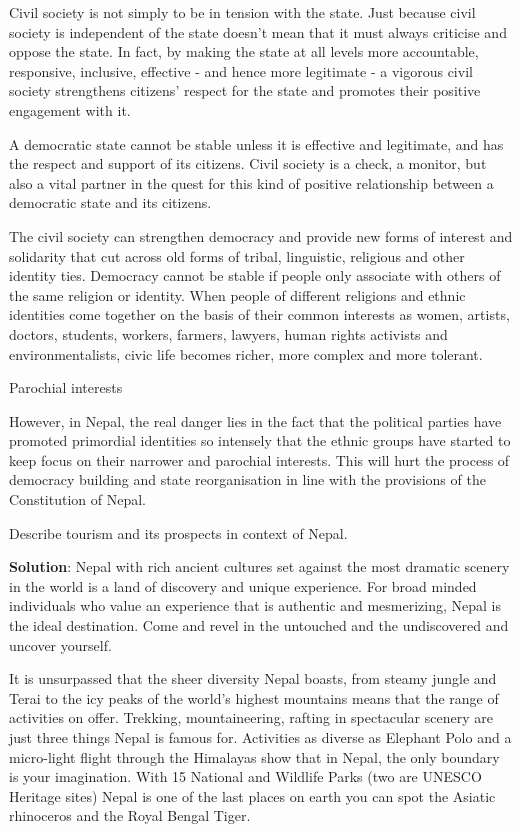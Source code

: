 \documentclass[
]{book}
\newcommand{\question}{\item}
\newenvironment{solution}{ {\bfseries Solution}:}{}
\begin{document}
\begin{questions}
Civil society is not simply to be in tension with the state. Just because civil society is independent of the state doesn't mean that it must always criticise and oppose the state. In fact, by making the state at all levels more accountable, responsive, inclusive, effective - and hence more legitimate - a vigorous civil society strengthens citizens' respect for the state and promotes their positive engagement with it.

A democratic state cannot be stable unless it is effective and legitimate, and has the respect and support of its citizens.  Civil society is a check, a monitor, but also a vital partner in the quest for this kind of positive relationship between a democratic state and its citizens.

The  civil society can strengthen democracy and provide new forms of interest and solidarity that cut across old forms of tribal, linguistic, religious and other identity ties. Democracy cannot be stable if people only associate with others of the same religion or identity. When people of different religions and ethnic identities come together on the basis of their common interests as women, artists, doctors, students, workers, farmers, lawyers, human rights activists and environmentalists, civic life becomes richer, more complex and more tolerant.

Parochial interests

However, in Nepal, the real danger lies in the fact that the political parties have promoted primordial identities so intensely that the ethnic groups have started to keep focus on their narrower and parochial interests. This will hurt the process of democracy building and state reorganisation in line with the provisions of the Constitution of Nepal.

\question Describe tourism and its prospects in context of Nepal.

\begin{solution}
Nepal with rich ancient cultures set against the most dramatic scenery in the world is a land of discovery and unique experience. For broad minded individuals who value an experience that is authentic and mesmerizing, Nepal is the ideal destination. Come and revel in the untouched and the undiscovered and uncover yourself.

It is unsurpassed that the sheer diversity Nepal boasts, from steamy jungle and Terai to the icy peaks of the world’s highest mountains means that the range of activities on offer. Trekking, mountaineering, rafting in spectacular scenery are just three things Nepal is famous for. Activities as diverse as Elephant Polo and a micro-light flight through the Himalayas show that in Nepal, the only boundary is your imagination. With 15 National and Wildlife Parks (two are UNESCO Heritage sites) Nepal is one of the last places on earth you can spot the Asiatic rhinoceros and the Royal Bengal Tiger.


\end{solution}
\end{questions}
\end{document}
